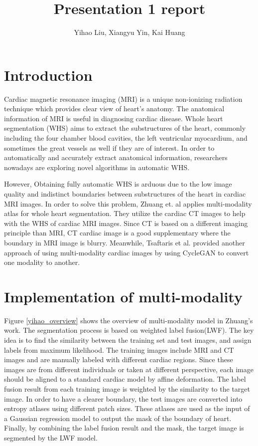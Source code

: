 \documentclass[10pt,sigconf,letterpaper,nonacm]{acmart}
\begin{document}

\thispagestyle{empty}

\title{Presentation 1 report}
\author{Yihao Liu, Xiangyu Yin, Kai Huang}
\date{}
\maketitle

\section{Introduction}
Cardiac magnetic resonance imaging (MRI) is a unique non-ionizing radiation technique which provides clear view of heart’s anatomy. The anatomical information of MRI is useful in diagnosing cardiac disease. Whole heart segmentation (WHS) aims to extract the substructures of the heart, commonly including the four chamber blood cavities, the left ventricular myocardium, and sometimes the great vessels as well if they are of interest\cite{zheng2008four}. In order to automatically and accurately extract anatomical information, researchers nowadays are exploring novel algorithms in automatic WHS. 

However, Obtaining fully automatic WHS is arduous due to the low image quality and indistinct boundaries between substructures of the heart in cardiac MRI images. In order to solve this problem, Zhuang et. al\cite{zhuang2016multi} applies multi-modality atlas for whole heart segmentation. They utilize the cardiac CT images to help with the WHS of cardiac MRI images. Since CT is based on a different imaging principle than MRI, CT cardiac image is a good supplementary where the boundary in MRI image is blurry. Meanwhile, Tsaftaris et al.\cite{Tsaftaris2017} provided another approach of using multi-modality cardiac images by using CycleGAN to convert one modality to another.

\section{Implementation of multi-modality}
 Figure \ref{yihao_overview} shows the overview of multi-modality model in Zhuang's work\cite{zhuang2016multi}. The segmentation process is based on weighted label fusion(LWF). The key idea is to find the similarity between the training set and test images, and assign labels from maximum likelihood. The training images include MRI and CT images and are manually labeled with different cardiac regions. Since these images are from different individuals or taken at different perspective, each image should be aligned to a standard cardiac model by affine deformation. The label fusion result from each training image is weighted by the similarity to the target image. In order to have a clearer boundary, the test images are converted into entropy atlases using different patch sizes. These atlases are used as the input of a Gaussian regression model to output the mask of the boundary of heart. Finally, by combining the label fusion result and the mask, the target image is segmented by the LWF model.
 
\end{document}
